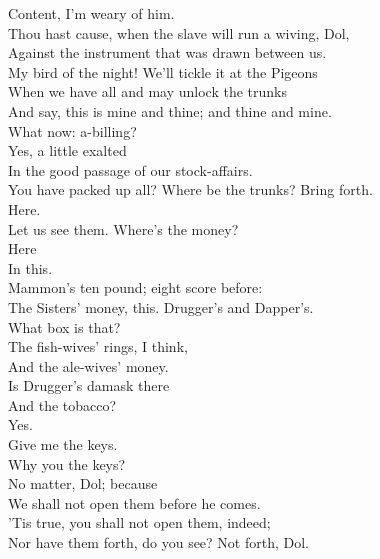 \documentclass[a4paper,oneside,12pt]{memoir}
\begin{document}
\begin{drama*}
\dolspeaks {} Content, I'm weary of him.\\
\subtlespeaks Thou hast cause, when the slave will run a wiving, Dol,\\
Against the instrument that was drawn between us.\\
My bird of the night! We'll tickle it at the Pigeons\\
When we have all and may unlock the trunks\\
And say, this is mine and thine; and thine and mine.\\
\facespeaks What now: a-billing?\\
\subtlespeaks {} Yes, a little exalted\\
In the good passage of our stock-affairs.\\
\facespeaks You have packed up all? Where be the trunks? Bring forth.\\
\subtlespeaks Here.\\
\facespeaks {} Let us see them. Where's the money?\\
\subtlespeaks {} Here\\
In this.\\
\facespeaks {} Mammon's ten pound; eight score before:\\
The Sisters' money, this. Drugger's and Dapper's.\\
What box is that?\\
\subtlespeaks {} The fish-wives' rings, I think,\\
And the ale-wives' money.\\
\facespeaks {} Is Drugger's damask there\\
And the tobacco?\\
\subtlespeaks {} Yes.\\
\facespeaks {} Give me the keys.\\
\dolspeaks Why you the keys?\\
\subtlespeaks {} No matter, Dol; because\\
We shall not open them before he comes.\\
\facespeaks 'Tis true, you shall not open them, indeed;\\
Nor have them forth, do you see? Not forth, Dol.\\

\end{drama*}
\end{document}
